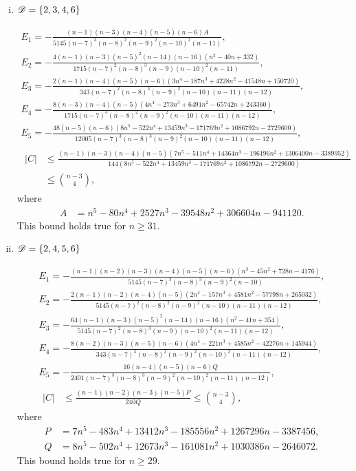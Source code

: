 \documentclass{amsart}
\begin{document}
{\begin{enumerate}[(i)]
\item $\mathscr{D}=\{2,3,4,6\}$

\begin{gather*}
E_1=-\frac{(n-1)(n-3)(n-4)(n-5)(n-6)A}{5145(n-7)^3(n-8)^2(n-9)^2(n-10)^2(n-11)},\\ 
E_2=-\frac{4(n-1)(n-3)(n-5)^2(n-14)(n-16)\left(n^2-40n+332\right)}{1715(n-7)^2(n-8)^3(n-9)(n-10)^2(n-11)},\\
E_3=-\frac{2(n-1)(n-4)(n-5)(n-6)\left(3n^4-187n^3+4228n^2-41548n+150720\right)}{343(n-7)^2(n-8)^3(n-9)^2(n-10)(n-11)(n-12)},\\
E_4=-\frac{8(n-3)(n-4)(n-5)\left(4n^4-273n^3+6491n^2-65742n+243360\right)}{1715(n-7)^3(n-8)^2(n-9)^2(n-10)(n-11)(n-12)},\\
E_5=-\frac{48(n-5)(n-6)\left(8n^5-522n^4+13459n^3-171769n^2+1086792n-2729600\right)}{12005(n-7)^3(n-8)^3(n-9)^2(n-10)(n-11)(n-12)},\\
\begin{aligned}
|C| &\le \frac{(n-1)(n-3)(n-4)(n-5)\left(7n^{5}-511n^{4}+14364n^{3}-196196n^{2}+1306400n-3389952\right)}{144\left(8n^5-522n^4+13459n^3-171769n^2+1086792n-2729600\right)}\\
&\leq \binom{n-3}{4},
\end{aligned}
\end{gather*}
where
\begin{align*}
    A &=n^5-80n^4+2527n^3-39548n^2+306604n-941120.
\end{align*}
This bound holds true for $n\ge 31.$

\item $\mathscr{D}=\{2,4,5,6\}$

\begin{gather*}
E_1=-\frac{(n-1)(n-2)(n-3)(n-4)(n-5)(n-6)\left(n^3-45n^2+728n-4176\right)}{5145(n-7)^3(n-8)^3(n-9)^2(n-10)},\\ 
E_2=-\frac{2(n-1)(n-2)(n-4)(n-5)\left(2n^4-157n^3+4581n^2-57798n+265032\right)}{5145(n-7)^2(n-8)^2(n-9)^2(n-10)(n-11)(n-12)},\\
E_3=-\frac{64(n-1)(n-3)(n-5)^2(n-14)(n-16)\left(n^2-41n+354\right)}{5145(n-7)^2(n-8)^3(n-9)(n-10)^2(n-11)(n-12)},\\
E_4=-\frac{8(n-2)(n-3)(n-5)(n-6)\left(4n^4-221n^3+4585n^2-42276n+145944\right)}{343(n-7)^3(n-8)^2(n-9)^2(n-10)^2(n-11)(n-12)},\\
E_5=-\frac{16(n-4)(n-5)(n-6)Q}{2401(n-7)^3(n-8)^3(n-9)^2(n-10)^2(n-11)(n-12)},\\
\begin{aligned}
|C| &\le \frac{(n-1)(n-2)(n-3)(n-5)P}{240Q} \leq \binom{n-3}{4},
\end{aligned}
\end{gather*}
where
\begin{align*}
    P &=7n^5-483n^4+13412n^3-185556n^2+1267296n-3387456,\\
    Q &=8n^5-502n^4+12673n^3-161081n^2+1030386n-2646072.
\end{align*}
This bound holds true for $n\ge 29.$


\end{enumerate}}
\end{document}
